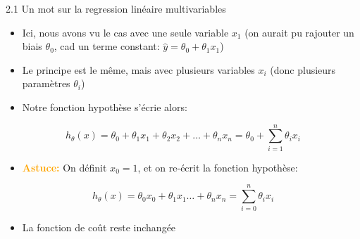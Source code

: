 \begin{frame}{2.1 Un mot sur la regression linéaire multivariables}
  \begin{itemize}
  \item Ici, nous avons vu le cas avec une seule variable $x_{1}$ (on aurait pu rajouter un biais $\theta_{0}$, cad un terme constant: $\hat{y} = \theta_{0} + \theta_{1}x_{1}$)
  \item Le principe est le même, mais avec plusieurs variables $x_{i}$ (donc plusieurs paramètres $\theta_{i}$)
  \item Notre fonction hypothèse s'écrie alors:
  \end{itemize}
  \begin{equation*}
    h_{\theta}(x) = \theta_{0} + \theta_{1}x_{1} + \theta_{2}x_{2} + \dots + \theta_{n}x_{n} = \theta_{0} + \displaystyle\sum_{i=1}^{n} \theta_{i} x_{i}
  \end{equation*}
  \begin{itemize}
    \item \textbf{\textcolor{orange}{Astuce:}} On définit $x_{0} = 1$, et on re-écrit la fonction hypothèse:
  \end{itemize}
  \begin{equation*}
    h_{\theta}(x) = \theta_{0}x_{0} + \theta_{1}x_{1} \dots + \theta_{n}x_{n} = \displaystyle\sum_{i=0}^{n} \theta_{i} x_{i}
  \end{equation*}

  \begin{itemize}
  \item La fonction de coût reste inchangée
  \end{itemize}
\end{frame}

